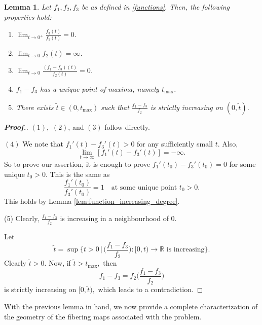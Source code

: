 \documentclass[11pt]{article}
\newtheorem{lemma}{Lemma}[section] %
\begin{document}
\begin{lemma}\label{lem:properties_of_fi}
Let $f_1, f_2, f_3$
be as defined in \eqref{functions}.
Then, the following properties hold:
\begin{enumerate}
    
\item[$(1)$] $\displaystyle \lim_{t \to 0^+} 
\frac{f_3(t)}{f_1(t)} = 0$.
    
\item[$(2)$] $\displaystyle \lim_{t \to 0} f_2(t) = \infty$.
    
\item[$(3)$] $\displaystyle \lim_{t \to 0} 
\frac{(f_1 - f_3)(t)}{f_2(t)} = 0$.
    
\item[$(4)$] $f_1 - f_3$
has a unique point of maxima, namely $t_{\max}$.
    
\item[$(5)$] There exists $\tilde{t} \in (0, t_{\max})$
such that $ 
\frac{f_1 - f_3}{f_2}$
is strictly increasing on $(0, \tilde{t})$.
\end{enumerate}
\end{lemma}


\begin{proof}[\bf Proof.]
$(1),$ $(2)$,
and $(3)$
follow directly.

$(4)$
We note that 
$
f_1'(t) - f_3'(t) > 0$
 for any sufficiently small $ t.$
Also,
\[
\lim_{t \to \infty} \left[ f_1'(t) - f_3'(t) \right]
 = -\infty.
\]
So to prove our assertion, it is enough to prove
$f_1'(t_0) - f_3'(t_0) = 0$
for some unique $t_0 > 0.$
This is the same as
\[
\frac{f_1'(t_0)}{f_3'(t_0)} = 1 \quad 
\text{at some unique point } t_0 > 0.
\]
This holds by Lemma 
\ref{lem:function_increasing_degree}.

(5) Clearly, $
\frac{f_1 - f_3}{f_2}$
is increasing in a neighbourhood of 0.

Let 
\[
\tilde{t} = \sup 
\Big \{ t > 0 \,\Big |\,
\Big  (
\frac{f_1 - f_3}{f_2} 
\Big  ): [0, t) \to \mathbb{R} 
\text{ is increasing} 
\Big \}.
\]
Clearly $\tilde{t} > 0.$
Now, if $\tilde{t} > t_{\max},$
then
\begin{equation*}
f_1 - f_3 = f_2 
\Big  ( 
\frac{f_1 - f_3}{f_2} 
\Big  )
\end{equation*}
is strictly increasing on $[0, \tilde{t}),$
which leads to a contradiction.
\end{proof}


With the previous lemma in hand, we now 
provide a complete characterization of the 
geometry of the fibering maps associated 
with the problem.
\end{document}
